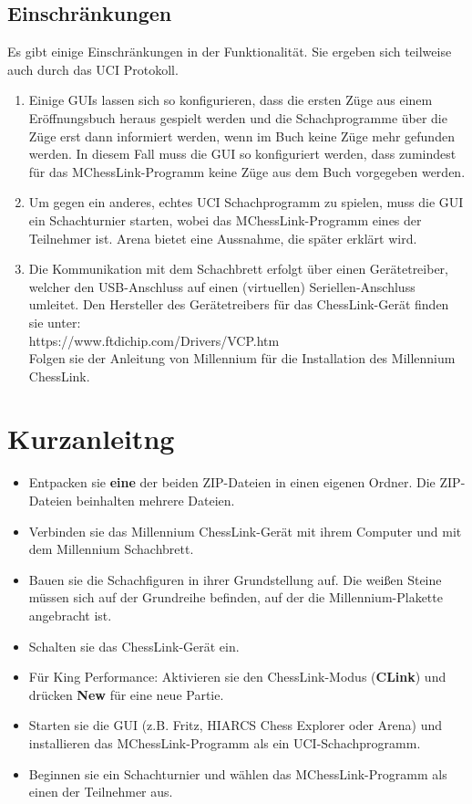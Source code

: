 \documentclass[11pt,a4paper]{article}
\begin{document}
\subsection{Einschränkungen}

Es gibt einige Einschränkungen in der Funktionalität. Sie ergeben sich teilweise auch durch das UCI Protokoll.

\begin{enumerate}
	\item Einige GUIs lassen sich so konfigurieren, dass die ersten Züge aus einem Eröffnungsbuch heraus gespielt werden und die Schachprogramme über die Züge erst dann informiert werden, wenn im Buch keine Züge mehr gefunden werden. In diesem Fall muss die GUI so konfiguriert werden, dass zumindest für das MChessLink-Programm keine Züge aus dem Buch vorgegeben werden.
	\item Um gegen ein anderes, echtes UCI Schachprogramm zu spielen, muss die GUI ein Schachturnier starten, wobei das MChessLink-Programm eines der Teilnehmer ist. Arena bietet eine Aussnahme, die später erklärt wird.
	\item Die Kommunikation mit dem Schachbrett erfolgt über einen Gerätetreiber, welcher den USB-Anschluss auf einen (virtuellen) Seriellen-Anschluss umleitet.  Den Hersteller des Gerätetreibers für das ChessLink-Gerät finden sie unter: \\ https://www.ftdichip.com/Drivers/VCP.htm
	\\Folgen sie der Anleitung von Millennium für die Installation des Millennium ChessLink.
\end{enumerate}

\pagebreak

\section{Kurzanleitng}
\begin{itemize}
	\item Entpacken sie \textbf{eine} der beiden ZIP-Dateien in einen eigenen Ordner. Die ZIP-Dateien beinhalten mehrere Dateien.
	\item Verbinden sie das Millennium ChessLink-Gerät mit ihrem Computer und mit dem Millennium Schachbrett.
	\item Bauen sie die Schachfiguren in ihrer Grundstellung auf. Die weißen Steine müssen sich auf der Grundreihe befinden, auf der die Millennium-Plakette angebracht ist.
	\item Schalten sie das ChessLink-Gerät ein.
	\item Für King Performance: Aktivieren sie den ChessLink-Modus (\textbf{CLink}) und drücken \textbf{New} für eine neue Partie.
	\item Starten sie die GUI (z.B. Fritz, HIARCS Chess Explorer oder Arena) und installieren das MChessLink-Programm als ein UCI-Schachprogramm.
	\item Beginnen sie ein Schachturnier und wählen das MChessLink-Programm als einen der Teilnehmer aus.
\end{itemize}
\end{document}
